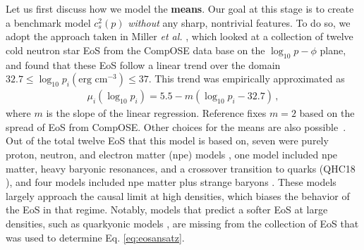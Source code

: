 \documentclass[aps,prd,nofootinbib,tightenlines,notitlepage,floatfix,superscriptaddress,showkeys,twocolumn]{revtex4-1}
\begin{document}
Let us first discuss how we model the {\bf means}. Our goal at this stage is to create a benchmark model $c_s^2(p)$ \textit{without} any sharp, nontrivial features. To do so, we adopt the approach taken in Miller \textit{et al.} \cite{Miller:2021qha}, which looked at a collection of twelve cold neutron star EoS from the CompOSE data base \cite{Typel:2013rza,Oertel:2016bki} on the $\log_{10}p - \phi$ plane, and found that these EoS follow a linear trend over the domain  $32.7 \leq \log_{10}p_i (\textrm{erg cm$^{-3}$}) \leq 37$. This trend was empirically approximated as
\begin{align}\label{eq:eosansatz}
    \mu_i(\log_{10}p_i) = 5.5 -m(\log_{10}p_i - 32.7)\,,
\end{align}
where $m$ is the slope of the linear regression. Reference \cite{Miller:2021qha} fixes $m=2$ based on the spread of EoS from CompOSE. Other choices for the means are also possible~\cite{Essick:2019ldf}. 
Out of the total twelve EoS that this model is based on, seven were purely proton, neutron, and electron matter (npe) models \cite{Baym:1971pw,Douchin:2001sv,Baldo:1997ag,Danielewicz:2008cm,Gulminelli:2015csa,Agrawal:2005ix,Reinhard:1995zz,Agrawal:2003xb,Gaitanos:2003zg,Grill:2014aea,Douchin:2001sv,Glendenning:1991es}, one model included npe matter, heavy baryonic resonances, and a crossover transition to quarks (QHC18 \cite{Akmal:1998cf,Togashi:2017mjp,Baym:2017whm}), and four models included npe matter plus strange baryons \cite{Glendenning:1991es,Oertel:2014qza,Douchin:2001sv,Dexheimer:2008ax,Schurhoff:2010ph,Dexheimer:2015qha,Dexheimer:2017nse,Gaitanos:2003zg,Grill:2014aea}. These models largely approach the causal limit at high densities, which biases the behavior of the EoS in that regime. Notably, models that predict a softer EoS at large densities, such as quarkyonic models \cite{McLerran:2018hbz,Duarte:2023cki,Duarte:2021tsx,Duarte:2020kvi,Kojo:2015fua}, are missing from the collection of EoS that was used to determine Eq. \eqref{eq:eosansatz}. 
\end{document}
